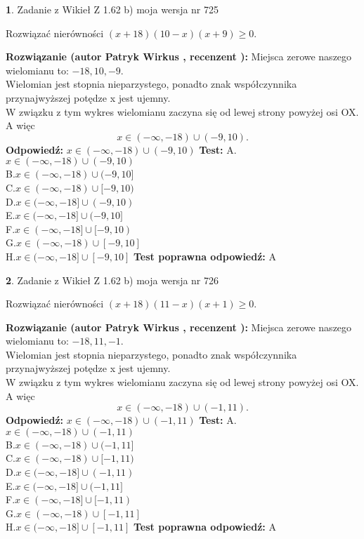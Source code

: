 \documentclass[12pt, a4paper]{article}
\theoremstyle{definition} %
\newtheorem{zad}{}
\newcommand{\zadStart}[1]{\begin{zad}#1\newline}
\newcommand{\zadStop}{\end{zad}}
\newcommand{\rozwStart}[2]{\noindent \textbf{Rozwiązanie (autor #1 , recenzent #2): }\newline}
\newcommand{\rozwStop}{\newline}
\newcommand{\odpStart}{\noindent \textbf{Odpowiedź:}\newline}
\newcommand{\odpStop}{\newline}
\newcommand{\testStart}{\noindent \textbf{Test:}\newline}
\newcommand{\testStop}{\newline}
\newcommand{\kluczStart}{\noindent \textbf{Test poprawna odpowiedź:}\newline}
\newcommand{\kluczStop}{\newline}
\begin{document}
\zadStart{Zadanie z Wikieł Z 1.62 b) moja wersja nr 725}

Rozwiązać nierówności $(x+18)(10-x)(x+9)\ge0$.
\zadStop
\rozwStart{Patryk Wirkus}{}
Miejsca zerowe naszego wielomianu to: $-18, 10, -9$.\\
Wielomian jest stopnia nieparzystego, ponadto znak współczynnika przy\linebreak najwyższej potędze x jest ujemny.\\ W związku z tym wykres wielomianu zaczyna się od lewej strony powyżej osi OX. A więc $$x \in (-\infty,-18) \cup (-9,10).$$
\rozwStop
\odpStart
$x \in (-\infty,-18) \cup (-9,10)$
\odpStop
\testStart
A.$x \in (-\infty,-18) \cup (-9,10)$\\
B.$x \in (-\infty,-18) \cup (-9,10]$\\
C.$x \in (-\infty,-18) \cup [-9,10)$\\
D.$x \in (-\infty,-18] \cup (-9,10)$\\
E.$x \in (-\infty,-18] \cup (-9,10]$\\
F.$x \in (-\infty,-18] \cup [-9,10)$\\
G.$x \in (-\infty,-18) \cup [-9,10]$\\
H.$x \in (-\infty,-18] \cup [-9,10]$
\testStop
\kluczStart
A
\kluczStop



\zadStart{Zadanie z Wikieł Z 1.62 b) moja wersja nr 726}

Rozwiązać nierówności $(x+18)(11-x)(x+1)\ge0$.
\zadStop
\rozwStart{Patryk Wirkus}{}
Miejsca zerowe naszego wielomianu to: $-18, 11, -1$.\\
Wielomian jest stopnia nieparzystego, ponadto znak współczynnika przy\linebreak najwyższej potędze x jest ujemny.\\ W związku z tym wykres wielomianu zaczyna się od lewej strony powyżej osi OX. A więc $$x \in (-\infty,-18) \cup (-1,11).$$
\rozwStop
\odpStart
$x \in (-\infty,-18) \cup (-1,11)$
\odpStop
\testStart
A.$x \in (-\infty,-18) \cup (-1,11)$\\
B.$x \in (-\infty,-18) \cup (-1,11]$\\
C.$x \in (-\infty,-18) \cup [-1,11)$\\
D.$x \in (-\infty,-18] \cup (-1,11)$\\
E.$x \in (-\infty,-18] \cup (-1,11]$\\
F.$x \in (-\infty,-18] \cup [-1,11)$\\
G.$x \in (-\infty,-18) \cup [-1,11]$\\
H.$x \in (-\infty,-18] \cup [-1,11]$
\testStop
\kluczStart
A
\kluczStop
\end{document}
